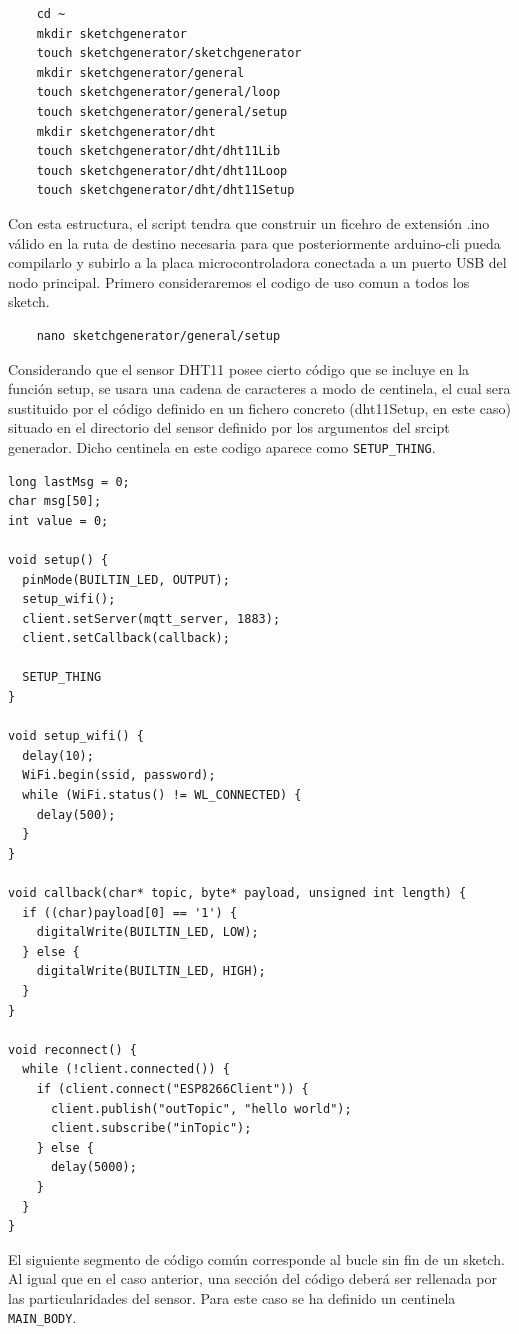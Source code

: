 \begin{verbatim}
    cd ~
    mkdir sketchgenerator
    touch sketchgenerator/sketchgenerator
    mkdir sketchgenerator/general
    touch sketchgenerator/general/loop
    touch sketchgenerator/general/setup
    mkdir sketchgenerator/dht
    touch sketchgenerator/dht/dht11Lib
    touch sketchgenerator/dht/dht11Loop
    touch sketchgenerator/dht/dht11Setup
\end{verbatim}

Con esta estructura, el \gls{script} tendra que construir un ficehro de extensión .ino válido en la ruta de destino necesaria para que posteriormente arduino-cli pueda compilarlo y subirlo a la placa microcontroladora conectada a un puerto USB del nodo principal. Primero consideraremos el codigo de uso comun a todos los \gls{sketch}.

\begin{verbatim}
    nano sketchgenerator/general/setup
\end{verbatim}

Considerando que el sensor DHT11 posee cierto código que se incluye en la función setup, se usara una cadena de caracteres a modo de centinela, el cual sera sustituido por el código definido en un fichero concreto (dht11Setup, en este caso) situado en el directorio del sensor definido por los argumentos del srcipt generador. Dicho centinela en este codigo aparece como \verb|SETUP_THING|.

\begin{verbatim}
long lastMsg = 0;
char msg[50];
int value = 0;

void setup() {
  pinMode(BUILTIN_LED, OUTPUT);
  setup_wifi();
  client.setServer(mqtt_server, 1883);
  client.setCallback(callback);

  SETUP_THING
}

void setup_wifi() {
  delay(10);
  WiFi.begin(ssid, password);
  while (WiFi.status() != WL_CONNECTED) {
    delay(500);
  }
}

void callback(char* topic, byte* payload, unsigned int length) {
  if ((char)payload[0] == '1') {
    digitalWrite(BUILTIN_LED, LOW);
  } else {
    digitalWrite(BUILTIN_LED, HIGH);
  }
}

void reconnect() {
  while (!client.connected()) {
    if (client.connect("ESP8266Client")) {
      client.publish("outTopic", "hello world");
      client.subscribe("inTopic");
    } else {
      delay(5000);
    }
  }
}
\end{verbatim}

El siguiente segmento de código común corresponde al bucle sin fin de un \gls{sketch}. Al igual que en el caso anterior, una sección del código deberá ser rellenada por las particularidades del sensor. Para este caso se ha definido un centinela \verb|MAIN_BODY|.

